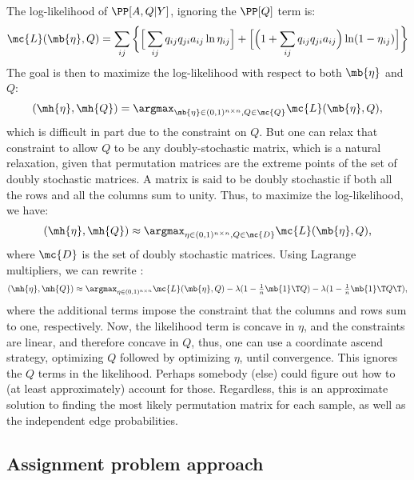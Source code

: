 The log-likelihood of $\PP[A,Q|Y]$, ignoring the $\PP[Q]$ term is:
\begin{align}
	\mc{L}(\mb{\eta},Q)  = \sum_{ij} \bigg\{\Big[\sum_{ij} q_{ij} q_{ji} a_{ij} \ln \eta_{ij}\Big] + \Big[ \Big(1+\sum_{ij} q_{ij} q_{ji} a_{ij}\Big) \ln (1-\eta_{ij})\Big]\bigg\}
\end{align}
The goal is then to maximize the log-likelihood with respect to both $\mb{\eta}$ and $Q$:
\begin{align}
	(\mh{\eta},\mh{Q}) = \argmax_{\mb{\eta} \in (0,1)^{n\times n} ,Q \in \mc{Q}} \mc{L}(\mb{\eta},Q),
\end{align}
which is difficult in part due to the constraint on $Q$.  But one can relax that constraint to allow $Q$ to be any doubly-stochastic matrix, which is a natural relaxation, given that permutation matrices are the extreme points of the set of doubly stochastic matrices.  A matrix is said to be doubly stochastic if both all the rows and all the columns sum to unity.  Thus, to maximize the log-likelihood, we have:
\begin{align}
	(\mh{\eta},\mh{Q}) \approx \argmax_{\eta \in  (0,1)^{n\times n}, Q \in \mc{D}} \mc{L}(\mb{\eta},Q),
\end{align}
where $\mc{D}$ is the set of doubly stochastic matrices.  Using Lagrange multipliers, we can rewrite \label{eq:mle}:
\begin{align}
	(\mh{\eta},\mh{Q}) \approx \argmax_{\eta \in  (0,1)^{n\times n}} \mc{L}(\mb{\eta},Q) - \lambda (1 - \tfrac{1}{n}\mb{1}\T Q) - \lambda (1 - \tfrac{1}{n}\mb{1}\T Q\T),
\end{align}
where the additional terms impose the constraint that the columns and rows sum to one, respectively.  Now, the likelihood term is concave in $\eta$, and the constraints are linear, and therefore concave in $Q$, thus, one can use a coordinate ascend strategy, optimizing $Q$ followed by optimizing $\eta$, until convergence. This ignores the $Q$ terms in the likelihood.  Perhaps somebody (else) could figure out how to (at least approximately) account for those.  Regardless, this is an approximate solution to finding the most likely permutation matrix for each sample, as well as the independent edge probabilities.   

\subsection{Assignment problem approach} %
\label{sub:graph_isomorphism_approach}


